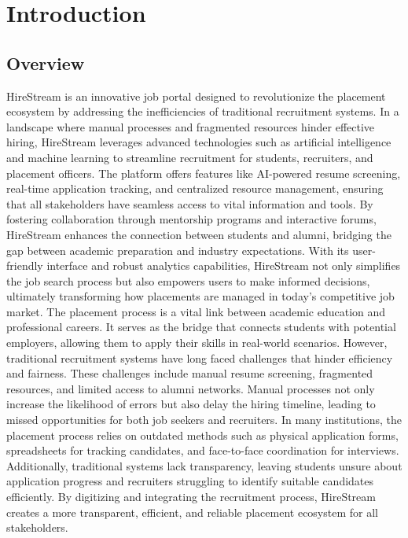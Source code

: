\documentclass[a4paper, 12pt]{report}
\makeatletter
\let\ps@plainorig\ps@plain
\let\ps@plain\ps@titlepagelayout
\makeatother
\begin{document}
\makeatletter
\let\ps@plain\ps@plainorig
\makeatother

\pagestyle{plain}

\titlespacing*{\chapter}{0pt}{-30pt}{5pt}
\setlength{\parindent}{32pt}

\chapter{Introduction}

\section{Overview}
HireStream is an innovative job portal designed to revolutionize the placement ecosystem by addressing the inefficiencies of traditional recruitment systems. In a landscape where manual processes and fragmented resources hinder effective hiring, HireStream leverages advanced technologies such as artificial intelligence and machine learning to streamline recruitment for students, recruiters, and placement officers. The platform offers features like AI-powered resume screening, real-time application tracking, and centralized resource management, ensuring that all stakeholders have seamless access to vital information and tools. By fostering collaboration through mentorship programs and interactive forums, HireStream enhances the connection between students and alumni, bridging the gap between academic preparation and industry expectations.
With its user-friendly interface and robust analytics capabilities, HireStream not only simplifies the job search process but also empowers users to make informed decisions, ultimately transforming how placements are managed in today’s competitive job market. The placement process is a vital link between academic education and professional careers. It serves as the bridge that connects students with potential employers, allowing them to apply their skills in real-world scenarios. However, traditional recruitment systems have long faced challenges that hinder efficiency and fairness.
These challenges include manual resume screening, fragmented resources, and limited access to alumni networks. Manual processes not only increase the likelihood of errors but also delay the hiring timeline, leading to missed opportunities for both job seekers and recruiters. In many institutions, the placement process relies on outdated methods such as physical application forms, spreadsheets for tracking candidates, and face-to-face coordination for interviews. Additionally, traditional systems lack transparency, leaving students unsure about application progress and recruiters struggling to identify suitable candidates efficiently. By digitizing and integrating the recruitment process, HireStream creates a more transparent, efficient, and reliable placement ecosystem for all stakeholders.
\end{document}
